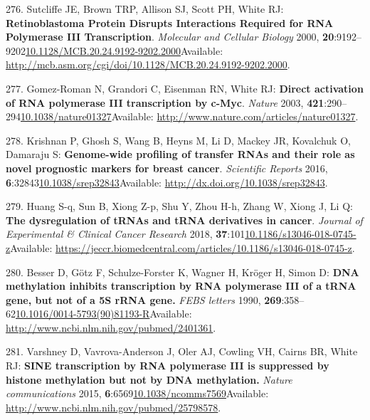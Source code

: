 \documentclass[
]{book}
\begin{document}
\leavevmode\hypertarget{ref-Sutcliffe2000}{}%
276. Sutcliffe JE, Brown TRP, Allison SJ, Scott PH, White RJ: \textbf{Retinoblastoma Protein Disrupts Interactions Required for RNA Polymerase III Transcription}. \emph{Molecular and Cellular Biology} 2000, \textbf{20}:9192--9202\href{https://doi.org/10.1128/MCB.20.24.9192-9202.2000}{10.1128/MCB.20.24.9192-9202.2000}Available: \url{http://mcb.asm.org/cgi/doi/10.1128/MCB.20.24.9192-9202.2000}.

\leavevmode\hypertarget{ref-Gomez-Roman2003}{}%
277. Gomez-Roman N, Grandori C, Eisenman RN, White RJ: \textbf{Direct activation of RNA polymerase III transcription by c-Myc}. \emph{Nature} 2003, \textbf{421}:290--294\href{https://doi.org/10.1038/nature01327}{10.1038/nature01327}Available: \url{http://www.nature.com/articles/nature01327}.

\leavevmode\hypertarget{ref-Krishnan2016}{}%
278. Krishnan P, Ghosh S, Wang B, Heyns M, Li D, Mackey JR, Kovalchuk O, Damaraju S: \textbf{Genome-wide profiling of transfer RNAs and their role as novel prognostic markers for breast cancer}. \emph{Scientific Reports} 2016, \textbf{6}:32843\href{https://doi.org/10.1038/srep32843}{10.1038/srep32843}Available: \url{http://dx.doi.org/10.1038/srep32843}.

\leavevmode\hypertarget{ref-Huang2018}{}%
279. Huang S-q, Sun B, Xiong Z-p, Shu Y, Zhou H-h, Zhang W, Xiong J, Li Q: \textbf{The dysregulation of tRNAs and tRNA derivatives in cancer}. \emph{Journal of Experimental \& Clinical Cancer Research} 2018, \textbf{37}:101\href{https://doi.org/10.1186/s13046-018-0745-z}{10.1186/s13046-018-0745-z}Available: \url{https://jeccr.biomedcentral.com/articles/10.1186/s13046-018-0745-z}.

\leavevmode\hypertarget{ref-Besser1990}{}%
280. Besser D, Götz F, Schulze-Forster K, Wagner H, Kröger H, Simon D: \textbf{DNA methylation inhibits transcription by RNA polymerase III of a tRNA gene, but not of a 5S rRNA gene.} \emph{FEBS letters} 1990, \textbf{269}:358--62\href{https://doi.org/10.1016/0014-5793(90)81193-R}{10.1016/0014-5793(90)81193-R}Available: \url{http://www.ncbi.nlm.nih.gov/pubmed/2401361}.

\leavevmode\hypertarget{ref-Varshney2015}{}%
281. Varshney D, Vavrova-Anderson J, Oler AJ, Cowling VH, Cairns BR, White RJ: \textbf{SINE transcription by RNA polymerase III is suppressed by histone methylation but not by DNA methylation.} \emph{Nature communications} 2015, \textbf{6}:6569\href{https://doi.org/10.1038/ncomms7569}{10.1038/ncomms7569}Available: \url{http://www.ncbi.nlm.nih.gov/pubmed/25798578}.
\end{document}
